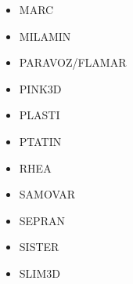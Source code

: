 \begin{itemize}
\item MARC
\cite{nesg97}
\cite{nesb99}


\item MILAMIN
\cite{daks08}
\cite{yakm11}
\cite{gebk12}
\cite{jobk14}
\cite{lukz15}
\cite{gehm15}
\cite{thkp15}
\cite{jads16}
\cite{maka16}



\item PARAVOZ/FLAMAR
\cite{poli93}
\cite{bujl01}
\cite{bupo01}
\cite{bast02}
\cite{clbb02}
\cite{hags03}
\cite{gehd03}
\cite{guhl04}
\cite{gewi04}
\cite{toba04}
\cite{bugu05}
\cite{yaab07}
\cite{buto07}
\cite{yaba08}
\cite{gecm09}
\cite{yahb09}
\cite{anwb12}
\cite{gech12}
\cite{gubc12}
\cite{gerb12}
\cite{fagm12}
\cite{frba14}
\cite{gagb14}
\cite{bufa14}
\cite{wulc15}
\cite{marl15}
\cite{gebw15}
\cite{svlh15}




\item PINK3D
\cite{vosc15}


\item PLASTI
\cite{fuwb06}



\item PTATIN
\cite{phil13}
\cite{mabl14}
\cite{mabl15}
\cite{jolp18}
\cite{jolm19}


\item RHEA
\cite{bugg08}
\cite{stgb10}
\cite{algs12}
\cite{busa13}

\item SAMOVAR
\cite{egat10}

\item SEPRAN
\cite{beky93}
\cite{vlvv94}
\cite{civv02}
\cite{vavv02}
\cite{vavs03}
\cite{vavv04}
\cite{vavv04b}
\cite{vavv05}
\cite{sepr05}
\cite{liva06a}
\cite{liva06b}
\cite{vant07}
\cite{brva07a}
\cite{brva07b}
\cite{plva08}
\cite{vavl09}
\cite{behy10}
\cite{syva10}
\cite{vahs11}
\cite{besy12}
\cite{beva12}
\cite{chgv12}
\cite{ancv13}
\cite{chsg14}
\cite{mova14}
\cite{vasy15}
\cite{zhdv19}

\item SISTER

\cite{olbm16}

\item SLIM3D

\cite{poso08}
\cite{qusp10}
\cite{brps12}
\cite{brps13}
\cite{brau13}
\cite{brun14}
\cite{hebr14}
\cite{kobf14}
\cite{clbq15}


\end{itemize}
